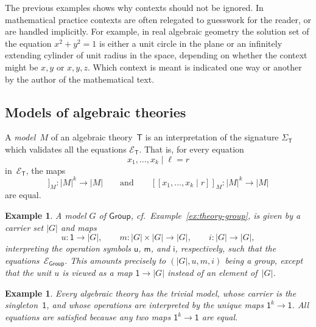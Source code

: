 \documentclass{amsart}
\newcommand{\theory}[1]{\mathsf{#1}} %
\newcommand{\signature}[1]{\Sigma_{\theory{#1}}} %
\newcommand{\equations}[1]{\mathcal{E}_{\theory{#1}}} %
\newcommand{\one}{\mathsf{1}} %
\newcommand{\sem}[1]{[\![#1]\!]} %
\newtheorem{example}[definition]{Example}
\begin{document}
The previous examples shows why contexts should not be ignored. In mathematical practice
contexts are often relegated to guesswork for the reader, or are handled implicitly. For
example, in real algebraic geometry the solution set of the equation $x^2 + y^2 = 1$ is
either a unit circle in the plane or an infinitely extending cylinder of unit radius in
the space, depending on whether the context might be $x, y$ or $x, y, z$. Which context is
meant is indicated one way or another by the author of the mathematical text.

\subsection{Models of algebraic theories}
\label{sec:models-algebr-theor}

A \emph{model~$M$} of an algebraic theory~$\theory{T}$ is an interpretation of the signature
$\signature{T}$ which validates all the equations $\equations{T}$. That is, for every
equation
%
\begin{equation*}
  x_1, \ldots, x_k \mid \ell = r
\end{equation*}
%
in~$\equations{T}$, the maps
%
\begin{equation*}
  \sem{x_1, \ldots, x_k \mid \ell}_M : |M|^k \to |M|
  \qquad\text{and}\qquad
  \sem{x_1, \ldots, x_k \mid r}_M : |M|^k \to |M|
\end{equation*}
%
are equal.

\begin{example}
  A model $G$ of $\theory{Group}$, cf.\ Example~\ref{ex:theory-group}, is given by a
  carrier set $|G|$ and maps
  \begin{equation*}
    u : \one \to |G|,\qquad
    m : |G| \times |G| \to |G|,\qquad
    i : |G| \to |G|,
  \end{equation*}
  interpreting the operation symbols $\mathsf{u}$, $\mathsf{m}$, and $\mathsf{i}$,
  respectively, such that the equations~$\equations{Group}$. This amounts precisely to
  $(|G|, u, m, i)$ being a group, except that the unit $u$ is viewed as a map
  $\one \to |G|$ instead of an element of~$|G|$.
\end{example}

\begin{example}
  Every algebraic theory has the \emph{trivial model}, whose carrier is the
  singleton~$\one$, and whose operations are interpreted by the unique maps
  $\one^k \to \one$. All equations are satisfied because any two maps $\one^k \to \one$
  are equal.
\end{example}
\end{document}
